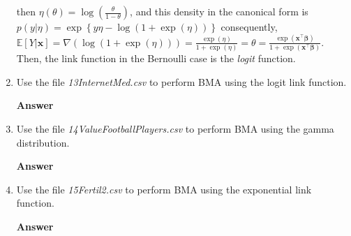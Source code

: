 \begin{enumerate}[leftmargin=*]
then $\eta(\theta)=\log\left(\frac{\theta}{1-\theta}\right)$, and this density in the canonical form is $p(y|\eta)=\exp\left\{ y\eta-\log(1+\exp(\eta))\right\}$  consequently, $\mathbb{E}[Y|\bm{x}]=\nabla\left(\log(1+\exp(\eta))\right)=\frac{\exp(\eta)}{1+\exp(\eta)}=\theta=\frac{\exp(\bm{x}^{\top}\bm{\beta})}{1+\exp(\bm{x}^{\top}\bm{\beta})}$. Then, the link function in the Bernoulli case is the \textit{logit} function.

\item Use the file \textit{13InternetMed.csv} to perform BMA using the logit link function.

\textbf{Answer}

\item Use the file \textit{14ValueFootballPlayers.csv} to perform BMA using the gamma distribution. 

\textbf{Answer} 

\item Use the file \textit{15Fertil2.csv} to perform BMA using the exponential link function.

\textbf{Answer} 
	
\end{enumerate}